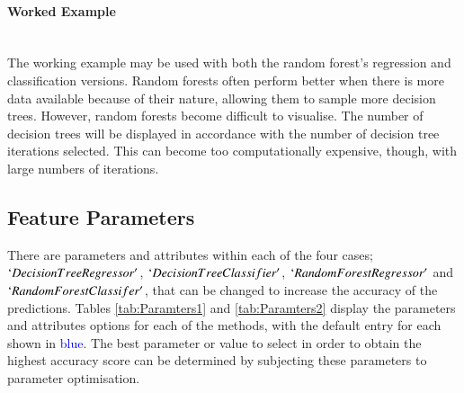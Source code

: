 \documentclass[../thesis.tex]{subfiles}
\begin{document}
\paragraph{Worked Example}\\
The working example may be used with both the random forest's regression and classification versions. Random forests often perform better when there is more data available because of their nature, allowing them to sample more decision trees. However, random forests become difficult to visualise. The number of decision trees will be displayed in accordance with the number of decision tree iterations selected. This can become too computationally expensive, though, with large numbers of iterations.

\subsection{Feature Parameters}
There are parameters and attributes within each of the four cases; $`DecisionTreeRegressor'$, $`DecisionTreeClassifier'$, $`RandomForestRegressor'$ and $`RandomForestClassifer'$, that can be changed to increase the accuracy of the predictions.
Tables \ref{tab:Paramters1} and \ref{tab:Paramters2} display the parameters and attributes options for each of the methods, with the default entry for each shown in \textcolor{blue}{blue}.
The best parameter or value to select in order to obtain the highest accuracy score can be determined by subjecting these parameters to parameter optimisation.
\end{document}
